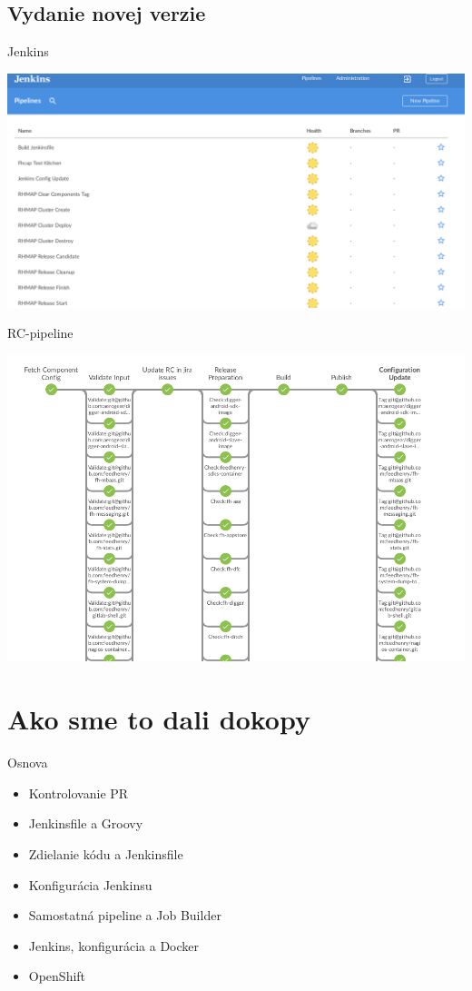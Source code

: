 \documentclass[bigger]{beamer}
\begin{document}
\subsection{Vydanie novej verzie}
\label{sec:org6abdeef}
\begin{frame}[label={sec:org18d235d}]{Jenkins}
\begin{center}
\includegraphics[width=.9\linewidth]{./014internal_jenkins.png}
\end{center}
\end{frame}
\begin{frame}[label={sec:org6c5fd08}]{RC-pipeline}
\begin{center}
\includegraphics[width=.9\linewidth]{./RC-pipeline.png}
\end{center}
\end{frame}

\section{Ako sme to dali dokopy}
\label{sec:orge4f8b99}
\begin{frame}[label={sec:orgf8650e7}]{Osnova}
\begin{itemize}
\item Kontrolovanie PR
\item Jenkinsfile a Groovy
\item Zdielanie kódu a Jenkinsfile
\item Konfigurácia Jenkinsu
\item Samostatná pipeline a Job Builder
\item Jenkins, konfigurácia a Docker
\item OpenShift
\end{itemize}
\end{frame}
\end{document}
